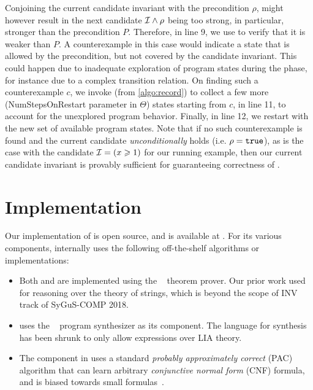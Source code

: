 \documentclass[conference]{IEEEtran}
\begin{document}
Conjoining the current candidate invariant \Inv with the precondition $\rho$,
might however result in the next candidate $\mathcal{I} \wedge \rho$ being too strong,
in particular, stronger than the precondition $P$.
Therefore, in line 9, we use \Checker to verify that it is weaker than $P$.
A counterexample in this case would indicate a state that is allowed by the precondition,
but not covered by the candidate invariant.
This could happen due to inadequate exploration of program states during the \Record phase,
for instance due to a complex transition relation.
On finding such a counterexample $c$, we invoke \RecordStatesFrom (from \cref{algo:record})
to collect a few more (\textsf{\small NumStepsOnRestart} parameter in $\Theta$) states starting from $c$,
in line 11, to account for the unexplored program behavior.
Finally, in line 12, we restart with the new set of available program states.
Note that if no such counterexample is found and the current candidate \emph{unconditionally} holds (i.e. $\rho = \texttt{true}$),
as is the case with the candidate $\mathcal{I} = (x \geqslant 1)$ for our running example, then
our current candidate invariant is provably sufficient for guaranteeing correctness of \SyGuSINVQuadruplet.





\section{Implementation} \label{subsec:Implementation}

\noindent
Our implementation of \LoopInvGen is open source, and is available at .
For its various components, \LoopInvGen internally uses the following off-the-shelf algorithms or implementations:
\begin{itemize}
    \item Both \GetModel and \Checker are implemented using the ~\cite{Moura2008Z3AE} theorem prover.
          Our prior work used ~\cite{Barrett2011CVC4} for reasoning over the theory of strings,
          which is beyond the scope of INV track of SyGuS-COMP 2018.
    
    \item \PIE uses the ~\cite{Albarghouthi2013RecursivePS} program synthesizer as its \Synth component.
          The language for synthesis has been shrunk to only allow expressions over LIA theory.
    
    \item The \BFL component in \PIE uses a standard \emph{probably approximately correct} (PAC) algorithm
          that can learn arbitrary \emph{conjunctive normal form} (CNF) formula,
          and is biased towards small formulas~\cite{Kearns1994AnIT}.
\end{itemize}
\end{document}
